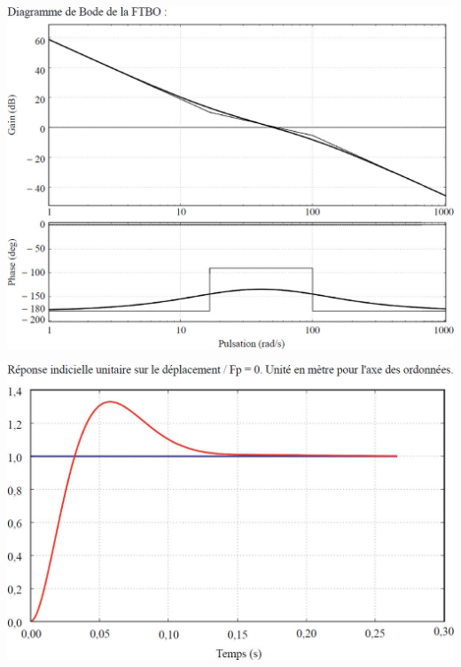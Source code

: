 \documentclass[10pt,fleqn]{article} %
\begin{document}
\begin{center}
\includegraphics[width=.5\linewidth]{images/fig_06}
\end{center}

\begin{center}
\includegraphics[width=.5\linewidth]{images/fig_07}
\end{center}
\end{document}
